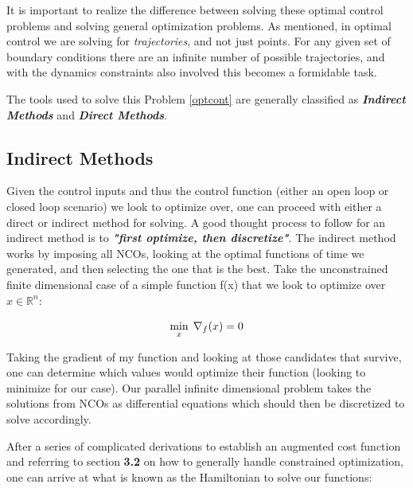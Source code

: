 \documentclass[twoside]{article}
\begin{document}
It is important to realize the difference between solving these optimal control problems and solving general optimization problems. As mentioned, in optimal control we are solving for \textit{trajectories}, and not just points. For any given set of boundary conditions there are an infinite number of possible trajectories, and with the dynamics constraints also involved this becomes a formidable task.

The tools used to solve this Problem \ref{optcont} are generally classified as \textit{\textbf{Indirect Methods}} and \textit{\textbf{Direct Methods}}.



\subsection{Indirect Methods}

Given the control inputs and thus the control function (either an open loop or closed loop scenario) we look to optimize over, one can proceed with either a direct or indirect method for solving. A good thought process to follow for an indirect method is to \textit{\textbf{"first optimize, then discretize"}}. The indirect method works by imposing all NCOs, looking at the optimal functions of time we generated, and then selecting the one that is the best. Take the unconstrained finite dimensional case of a simple function f(x) that we look to optimize over $x \in \mathbb{R}^n$: 

$$\underset{x}{\text{min}} \:\: \nabla_f(x) = 0 \\$$

Taking the gradient of my function and looking at those candidates that survive, one can determine which values would optimize their function (looking to minimize for our case). Our parallel infinite dimensional problem takes the solutions from NCOs as differential equations which should then be discretized to solve accordingly. 

After a series of complicated derivations to establish an augmented cost function and referring to section \textbf{3.2} on how to generally handle constrained optimization, one can arrive at what is known as the Hamiltonian to solve our functions: 
\end{document}
